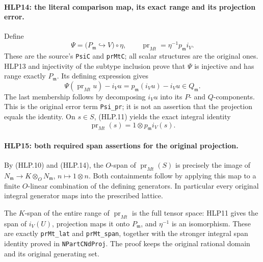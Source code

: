 \paragraph{HLP14: the literal comparison map, its exact range and its projection error.}
\label{claim:HLP14}
Define
\[
 \Psi=\bigl(P_{\mathfrak m}\hookrightarrow V\bigr)\circ\eta,
 \qquad \operatorname{pr}_{Mt}=\eta^{-1}p_{\mathfrak m}i_V.
                                                               \tag{HLP.12}
\]
These are the source's \texttt{PsiC} and \texttt{prMtC}; all scalar
structures are the original ones. HLP13 and injectivity of the
subtype inclusion prove that \(\Psi\) is injective and has range
exactly \(P_{\mathfrak m}\). Its defining expression gives
\[
       \Psi(\operatorname{pr}_{Mt}u)-i_Vu
         =p_{\mathfrak m}(i_Vu)-i_Vu\in Q_{\mathfrak m}. \tag{HLP.13}
\]
The last membership follows by decomposing \(i_Vu\) into its
\(P\)- and \(Q\)-components. This is the original error term
\texttt{Psi\_pr}; it is not an assertion that the projection equals
the identity. On \(s\in S\), (HLP.11) yields the exact integral
identity
\[
       \operatorname{pr}_{Mt}(s)=1\otimes p_{\mathfrak m}i_V(s).
                                                               \tag{HLP.14}
\]

\paragraph{HLP15: both required span assertions for the original projection.}
\label{claim:HLP15}
By (HLP.10) and (HLP.14), the \(O\)-span of
\(\operatorname{pr}_{Mt}(S)\) is precisely the image of
\(N_{\mathfrak m}\to K\otimes_ON_{\mathfrak m}\),
\(n\mapsto1\otimes n\). Both containments follow by applying this
map to a finite \(O\)-linear combination of the defining
generators. In particular every original integral generator maps
into the prescribed lattice.

The \(K\)-span of the entire range of \(\operatorname{pr}_{Mt}\)
is the full tensor space: HLP11 gives the span of \(i_V(U)\),
projection maps it onto \(P_{\mathfrak m}\), and \(\eta^{-1}\)
is an isomorphism. These are exactly \texttt{prMt\_lat} and
\texttt{prMt\_span}, together with the stronger integral span
identity proved in \texttt{NPartCNdProj}. The proof keeps the
original rational domain and its original generating set.

